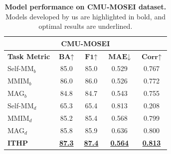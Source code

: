 \begin{table}
\vspace{-0.26 cm}
\setlength{\abovecaptionskip}{0.2 cm}
\setlength{\belowcaptionskip}{-0.366 cm} 
\centering
\setlength\tabcolsep{5.06 pt}
\begin{tabular}{lcccc}
\multicolumn{5}{c}{\textbf{CMU-MOSEI}} \\
\hline\hline
\textbf{Task Metric} & $\textbf{BA}{\uparrow}$ & $\textbf{F1}{\uparrow}$ & $\textbf{MAE}{\downarrow}$ & $\textbf{Corr}{\uparrow}$ \\
\midrule
Self-MM$_b$ & 85.0 & 85.0 & 0.529 & 0.767 \\
MMIM$_b$ & 86.0 & 86.0 & 0.526 & 0.772 \\
MAG$_b$ & 84.8 & 84.7 & 0.543 & 0.755 \\

Self-MM$_d$ & 65.3 & 65.4 & 0.813 & 0.208 \\
MMIM$_d$ & 85.2 & 85.4 & 0.568 & 0.799 \\
MAG$_d$ & 85.8 & 85.9 & 0.636 & 0.800 \\


\textbf{ITHP} & \textbf{\uline{87.3}} & \textbf{\uline{87.4}} & \textbf{\uline{0.564}} & \textbf{\uline{0.813}} \\
\hline\hline
\end{tabular}
\caption{\textbf{Model performance on CMU-MOSEI dataset.} Models developed by us are highlighted in bold, and optimal results are underlined.} %
\label{tab:ModelsPerformance_MOSEI}
\end{table}